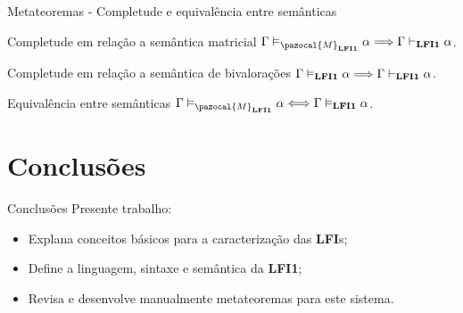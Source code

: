 \documentclass[xcolor=table]{beamer}
\newcommand{\lfium}{{\normalfont\textbf{LFI1}}}
\newcommand{\lfis}{{\normalfont\textbf{LFI}s}}
\newcommand{\conmat}{\vDash_{\pazocal{M}_{\lfium{}}}}
\newcommand{\conval}{\vDash_{\lfium{}}}
\newcommand{\conhil}{\vdash_{\lfium{}}}
\begin{document}
    \begin{frame}{Metateoremas {-} Completude e equivalência entre semânticas}
        \begin{block}{Completude em relação a semântica matricial}
            $\Gamma \conmat \alpha \Longrightarrow \Gamma \conhil \alpha$.
        \end{block}

        \begin{block}{Completude em relação a semântica de bivalorações}
           $\Gamma \conval \alpha \Longrightarrow \Gamma \conhil \alpha$.
        \end{block}

        \begin{block}{Equivalência entre semânticas}
            $\Gamma \conmat \alpha \Longleftrightarrow \Gamma \conval \alpha$.
        \end{block}
    \end{frame}
        

\section[]{Conclusões}
    \begin{frame}{Conclusões}
        Presente trabalho:
        \begin{itemize}
            \item Explana conceitos básicos para a caracterização das \lfis{};
            \item Define a linguagem, sintaxe e semântica da \lfium{};
            \item Revisa e desenvolve manualmente metateoremas para este sistema.
        \end{itemize}
    \end{frame}
\end{document}
